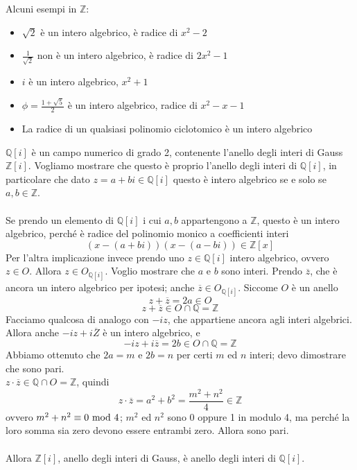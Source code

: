 \begin{esempio}
	Alcuni esempi in $\mathbb{Z}$:
	\begin{itemize}
		\item $\sqrt{2}$ è un intero algebrico, è radice di $x^2-2$
		\item $\frac{1}{\sqrt{2}}$ non è un intero algebrico, è radice di $2x^2-1$
		\item $i$ è un intero algebrico, $x^2+1$
		\item $\phi=\frac{1+\sqrt{5}}{2}$ è un intero algebrico, radice di $x^2-x-1$
		\item La radice di un qualsiasi polinomio ciclotomico è un intero algebrico
	\end{itemize}
\end{esempio}
\begin{esempio}
	$\mathbb{Q}[i]$ è un campo numerico di grado 2, contenente l'anello degli interi di Gauss $\mathbb{Z}[i]$. Vogliamo mostrare che questo è proprio l'anello degli interi di $\mathbb{Q}[i]$, in particolare che dato $z=a+bi\in\mathbb{Q}[i]$ questo è intero algebrico se e solo se $a,b\in\mathbb{Z}$. \\ \\
	Se prendo un elemento di $\mathbb{Q}[i]$ i cui $a,b$ appartengono a $\mathbb{Z}$, questo è un intero algebrico, perché è radice del polinomio monico a coefficienti interi
	\begin{equation*}
	\left(x-(a+bi)\right)\left(x-(a-bi)\right)\in\mathbb{Z}[x]
	\end{equation*}
	Per l'altra implicazione invece prendo uno $z\in\mathbb{Q}[i]$ intero algebrico, ovvero $z\in O$. Allora $z\in O_{\mathbb{Q}[i]}$. Voglio mostrare che $a$ e $b$ sono interi. Prendo $\overline{z}$, che è ancora un intero algebrico per ipotesi; anche $\overline{z}\in O_{\mathbb{Q}[i]}$. Siccome $O$ è un anello
	\begin{equation*}
	z+\overline{z}=2a\in O
	\end{equation*}
	\begin{equation*}
	z+\overline{z}\in O \cap \mathbb{Q} = \mathbb{Z}
	\end{equation*}
	Facciamo qualcosa di analogo con $-iz$, che appartiene ancora agli interi algebrici. Allora anche $-iz+i\overline{Z}$ è un intero algebrico, e 
	\begin{equation*}
	-iz+i\overline{z}=2b \in O\cap\mathbb{Q}=\mathbb{Z}
	\end{equation*}
	Abbiamo ottenuto che $2a=m$ e $2b=n$ per certi $m$ ed $n$ interi; devo dimostrare che sono pari. \\ $z\cdot\overline{z}\in\mathbb{Q}\cap O =\mathbb{Z}$, quindi
	\begin{equation*}
	z\cdot\overline{z}=a^2+b^2=\frac{m^2+n^2}{4}\in\mathbb{Z}
	\end{equation*}
	ovvero $m^2+n^2\equiv0\ \mathrm{mod}\ 4$; $m^2$ ed $n^2$ sono 0 oppure 1 in modulo 4, ma perché la loro somma sia zero devono essere entrambi zero. Allora sono pari. \\ \\ Allora $\mathbb{Z}[i]$, anello degli interi di Gauss, è anello degli interi di $\mathbb{Q}[i]$.
\end{esempio}
